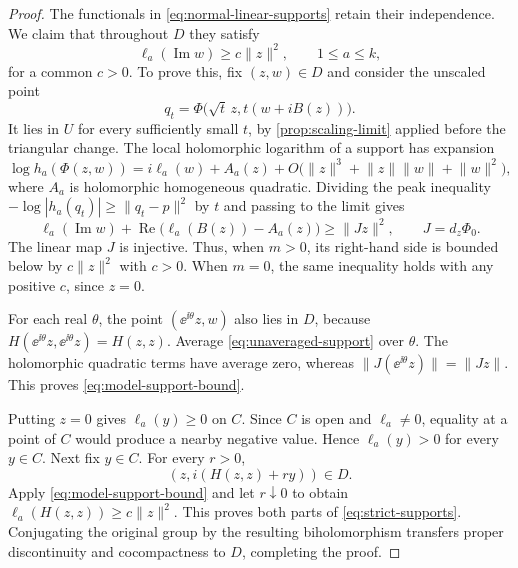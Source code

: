 \begin{proof}
The functionals in \eqref{eq:normal-linear-supports} retain their independence.  We claim that throughout $D$ they satisfy
\begin{equation}
\label{eq:model-support-bound}
 \ell_a(\operatorname{Im}w)\ge c\lVert z\rVert^2,
 \qquad 1\le a\le k,
\end{equation}
for a common $c>0$.  To prove this, fix $(z,w)\in D$ and consider the unscaled point
\[
 q_t=\Phi\bigl(\sqrt t\,z,
                 t(w+iB(z))\bigr).
\]
It lies in $U$ for every sufficiently small $t$, by \cref{prop:scaling-limit} applied before the triangular change.  The local holomorphic logarithm of a support has expansion
\[
 \log h_a(\Phi(z,w))
   =i\ell_a(w)+A_a(z)
      +O\bigl(\lVert z\rVert^3+
               \lVert z\rVert\lVert w\rVert+
               \lVert w\rVert^2\bigr),
\]
where $A_a$ is holomorphic homogeneous quadratic.  Dividing the peak inequality $-\log|h_a(q_t)|\ge\lVert q_t-p\rVert^2$ by $t$ and passing to the limit gives
\begin{equation}
\label{eq:unaveraged-support}
 \ell_a(\operatorname{Im}w)
       +\operatorname{Re}\bigl(\ell_a(B(z))-A_a(z)\bigr)
 \ge \lVert Jz\rVert^2,
 \qquad J=d_z\Phi_0.
\end{equation}
The linear map $J$ is injective.  Thus, when $m>0$, its right-hand side is bounded below by $c\lVert z\rVert^2$ with $c>0$.  When $m=0$, the same inequality holds with any positive $c$, since $z=0$.

For each real $\theta$, the point $(\ee^{\ii\theta}z,w)$ also lies in $D$, because $H(\ee^{\ii\theta}z,\ee^{\ii\theta}z)=H(z,z)$.  Average \eqref{eq:unaveraged-support} over $\theta$.  The holomorphic quadratic terms have average zero, whereas $\lVert J(\ee^{\ii\theta}z)\rVert=\lVert Jz\rVert$.  This proves \eqref{eq:model-support-bound}.

Putting $z=0$ gives $\ell_a(y)\ge0$ on $C$.  Since $C$ is open and $\ell_a\ne0$, equality at a point of $C$ would produce a nearby negative value.  Hence $\ell_a(y)>0$ for every $y\in C$.  Next fix $y\in C$. For every $r>0$,
\[
 (z,i(H(z,z)+ry))\in D.
\]
Apply \eqref{eq:model-support-bound} and let $r\downarrow0$ to obtain $\ell_a(H(z,z))\ge c\lVert z\rVert^2$.  This proves both parts of \eqref{eq:strict-supports}.  Conjugating the original group by the resulting biholomorphism transfers proper discontinuity and cocompactness to $D$, completing the proof.
\end{proof}
